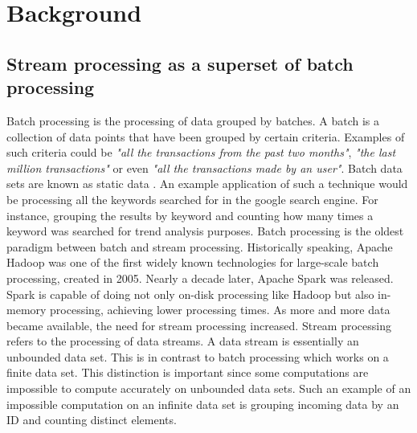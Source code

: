 \chapter{Background}\label{chap:background} \minitoc

\section{Stream processing as a superset of batch processing} \label{sec:stream-superset}

Batch processing is the processing of data grouped by batches. A batch is a collection of data points that have been grouped by certain criteria. Examples of such criteria could be \textit{"all the transactions from the past two months"}, \textit{"the last million transactions"} or even \textit{"all the transactions made by an user"}. Batch data sets are known as static data \cite{Martin-Batch-Defin}. An example application of such a technique would be processing all the keywords searched for in the google search engine. For instance, grouping the results by keyword and counting how many times a keyword was searched for trend analysis purposes. Batch processing is the oldest paradigm between batch and stream processing. Historically speaking, Apache Hadoop \cite{hadoop} was one of the first widely known technologies for large-scale batch processing, created in 2005. Nearly a decade later, Apache Spark \cite{spark} was released. Spark is capable of doing not only on-disk processing like Hadoop but also in-memory processing, achieving lower processing times. As more and more data became available, the need for stream processing increased. Stream processing refers to the processing of data streams. A data stream is essentially an unbounded data set. This is in contrast to batch processing which works on a finite data set. This distinction is important since some computations are impossible to compute accurately on unbounded data sets. Such an example of an impossible computation on an infinite data set is grouping incoming data by an ID and counting distinct elements.

